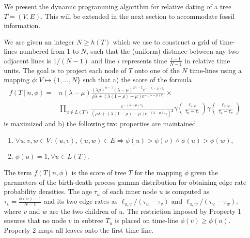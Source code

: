 \documentclass{llncs}
\newcommand{\ejmcomment}[1]{{\color{green} #1}}
\begin{document}
We present the dynamic programming algorithm for relative dating of a tree
$T=(V,E)$. This will be extended in the next section to accommodate fossil
information.

We are given an integer $N \geq h(T)$ which we use to construct a grid of
time-lines numbered from 1 to $N$, such that the (uniform) distance between any
two adjacent lines is $1 / (N-1)$ and line $i$ represents time
$\frac{i-1}{N-1}$ in relative time units. The goal is to project each node of
$T$ onto one of the $N$ time-lines using a mapping $\phi : V \mapsto
\{1,\ldots,N\}$ such that a) the score of the formula
%
%
\begin{equation}\label{eq:score}
\begin{split}
f(T\ |\ n,\phi) = & n (\lambda-\mu)
                    \frac {(\lambda\rho)^{n-1} (\lambda-\mu)^{2n-2}
                           e^{-(\lambda-\mu)\tau_r}}
                          {\rho\lambda + 
                           (\lambda(1 -\rho)-\mu)
                           e^{-(\lambda-\mu)\tau_r}} \times  \\
                  & \prod_{u\notin L(T)}\frac{e^{-(\lambda-\mu)\tau_u}}
                                             {(\rho\lambda +
                                              (\lambda(1-\rho)-\mu)
                                              e^{-(\lambda-\mu)\tau_u})^2}
                                        \gamma(\frac{\ell_{u,v}}{\tau_u-\tau_v})
                                        \gamma(\frac{\ell_{u,w}}{\tau_u-\tau_w}).
\end{split}
\end{equation}
%
%
is maximized and b) the following two properties are maintained
%
%
\begin{enumerate}
\item $\forall u,v,w \in V : (u,v), (u,w) \in E \Rightarrow \phi(u) > \phi(v)%
                                                     \wedge \phi(u) > \phi(w)$,
\item $\phi(u) = 1, \forall u \in L(T)$.
\end{enumerate}
%
%
The term $f(T\ |\ n,\phi)$ is the score of tree $T$ for the mapping $\phi$
given the parameters of the birth-death process gamma distribution for
obtaining edge rate probability densities.  The age $\tau_u$ of each inner node
$u$ is computed as $\tau_v = \frac{\phi(u)-1}{N-1}$ and its two edge rates as
$\ell_{u,v}/(\tau_u - \tau_v)$ and $\ell_{u,w}/(\tau_u-\tau_w)$, where $v$ and
$w$ are the two children of $u$.
%
The restriction imposed by Property 1 ensures that no node $v$ in subtree $T_u$
is placed on time-line $\phi(v) \geq \phi(u)$. Property 2 maps all leaves onto
the first time-line.
%
%
\end{document}
